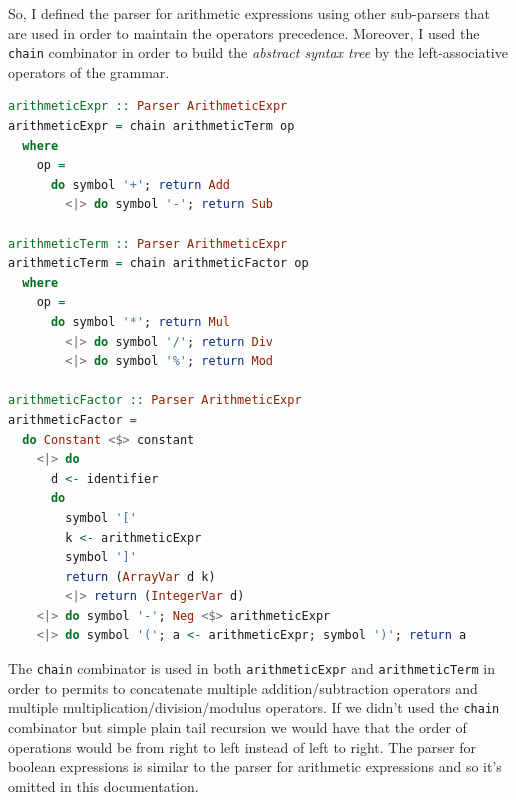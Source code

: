 \documentclass[12pt,a4paper]{article}
\begin{document}
So, I defined the parser for arithmetic expressions using other sub-parsers that are used in order to maintain the operators precedence.
Moreover, I used the \texttt{chain} combinator in order to build the \textit{abstract syntax tree} by the left-associative operators of the grammar.
\begin{lstlisting}[language=Haskell, style=custom-style]
arithmeticExpr :: Parser ArithmeticExpr
arithmeticExpr = chain arithmeticTerm op
  where
    op =
      do symbol '+'; return Add
        <|> do symbol '-'; return Sub

arithmeticTerm :: Parser ArithmeticExpr
arithmeticTerm = chain arithmeticFactor op
  where
    op =
      do symbol '*'; return Mul
        <|> do symbol '/'; return Div
        <|> do symbol '%'; return Mod

arithmeticFactor :: Parser ArithmeticExpr
arithmeticFactor =
  do Constant <$> constant
    <|> do
      d <- identifier
      do
        symbol '['
        k <- arithmeticExpr
        symbol ']'
        return (ArrayVar d k)
        <|> return (IntegerVar d)
    <|> do symbol '-'; Neg <$> arithmeticExpr
    <|> do symbol '('; a <- arithmeticExpr; symbol ')'; return a
\end{lstlisting}
The \texttt{chain} combinator is used in both \texttt{arithmeticExpr} and \texttt{arithmeticTerm} in order to permits to concatenate multiple addition/subtraction operators and multiple multiplication/division/modulus operators.
If we didn't used the \texttt{chain} combinator but simple plain tail recursion we would have that the order of operations would be from right to left instead of left to right.
The parser for boolean expressions is similar to the parser for arithmetic expressions and so it's omitted in this documentation.
\end{document}
